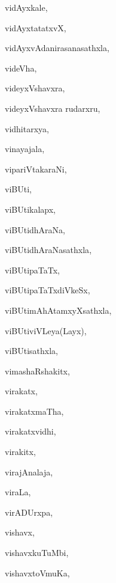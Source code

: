 \begin{multicols}{3}
{\noindent
{vidAyxkale}, \pageref{vidAyxkale}

\noindent
{vidAyxtatatxvX}, \pageref{vidAyxtatatxvX}

\noindent
{vidAyxvAdanirasanasathxla}, \pageref{vidAyxvAdanirasanasathxla}

\noindent
{videVha}, \pageref{videVha}

\noindent
{videyxVshavxra}, \pageref{videyxVshavxra}

\noindent
{videyxVshavxra rudarxru}, \pageref{videyxVshavxrarudarxru}

\noindent
{vidhitarxya}, \pageref{vidhitarxya}

\noindent
{vinayajala}, \pageref{vinayajala}

\noindent
{vipariVtakaraNi}, \pageref{vipariVtakaraNi}

\noindent
{viBUti}, \pageref{viBUti}

\noindent
{viBUtikalapx}, \pageref{viBUtikalapx}

\noindent
{viBUtidhAraNa}, \pageref{viBUtidhAraNa}

\noindent
{viBUtidhAraNasathxla}, \pageref{viBUtidhAraNasathxla}

\noindent
{viBUtipaTaTx}, \pageref{viBUtipaTaTx}

\noindent
{viBUtipaTaTxdiVkeSx}, \pageref{viBUtipaTaTxdiVkeSx}

\noindent
{viBUtimAhAtamxyXsathxla}, \pageref{viBUtimAhAtamxyXsathxla}

\noindent
{viBUtiviVLeya(Layx)}, \pageref{viBUtiviVLeyaLayx}

\noindent
{viBUtisathxla}, \pageref{viBUtisathxla}

\noindent
{vimashaRshakitx}, \pageref{vimashaRshakitx}

\noindent
{virakatx}, \pageref{virakatx}

\noindent
{virakatxmaTha}, \pageref{virakatxmaTha}

\noindent
{virakatxvidhi}, \pageref{virakatxvidhi}

\noindent
{virakitx}, \pageref{virakitx}

\noindent
{virajAnalaja}, \pageref{virajAnalaja}

\noindent
{viraLa}, \pageref{viraLa}

\noindent
{virADUrxpa}, \pageref{virADUrxpa}

\noindent
{vishavx}, \pageref{vishavx}

\noindent
{vishavxkuTuMbi}, \pageref{vishavxkuTuMbi}

\noindent
{vishavxtoVmuKa}, \pageref{vishavxtoVmuKa}

}
\end{multicols}
